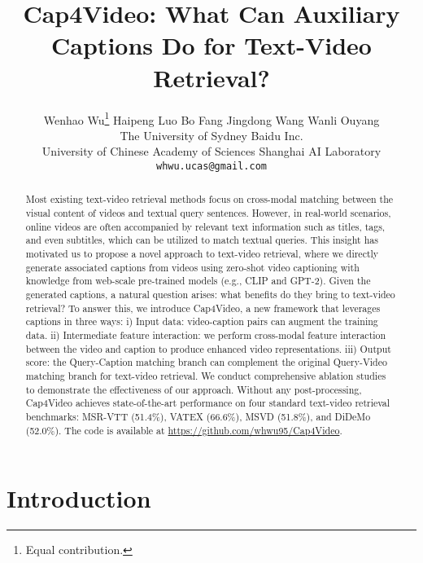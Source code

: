 \documentclass[10pt,twocolumn,letterpaper]{article}
\begin{document}
\title{Cap4Video: What Can Auxiliary Captions Do for Text-Video Retrieval?}

\author{Wenhao Wu\thanks{Equal contribution.}\qquad
Haipeng Luo\qquad
Bo Fang\qquad
Jingdong Wang\qquad
Wanli Ouyang\\
The University of Sydney \qquad Baidu Inc. \\ 
University of Chinese Academy of Sciences  \qquad Shanghai AI Laboratory\\
{\tt\small whwu.ucas@gmail.com}
}

\maketitle

\begin{abstract}








Most existing text-video retrieval methods focus on cross-modal matching between the visual content of videos and textual query sentences. However, in real-world scenarios, online videos are often accompanied by relevant text information such as titles, tags, and even subtitles, which can be utilized to match textual queries. 
This insight has motivated us to propose a novel approach to text-video retrieval, where we directly generate associated captions from videos using zero-shot video captioning with knowledge from web-scale pre-trained models (e.g., CLIP and GPT-2).
Given the generated captions, a natural question arises: what benefits do they bring to text-video retrieval? To answer this, we introduce Cap4Video, a new framework that leverages captions in three ways: i) Input data: video-caption pairs can augment the training data. ii) Intermediate feature interaction: we perform cross-modal feature interaction between the video and caption to produce enhanced video representations. iii) Output score: the Query-Caption matching branch can complement the original Query-Video matching branch for text-video retrieval.
We conduct comprehensive ablation studies to demonstrate the effectiveness of our approach. Without any post-processing, Cap4Video achieves state-of-the-art performance on four standard text-video retrieval benchmarks: MSR-VTT (51.4\%), VATEX (66.6\%), MSVD (51.8\%), and DiDeMo (52.0\%). 
The code is available at \url{https://github.com/whwu95/Cap4Video}.

\end{abstract} 
\section{Introduction}
\label{sec:intro}
\end{document}
